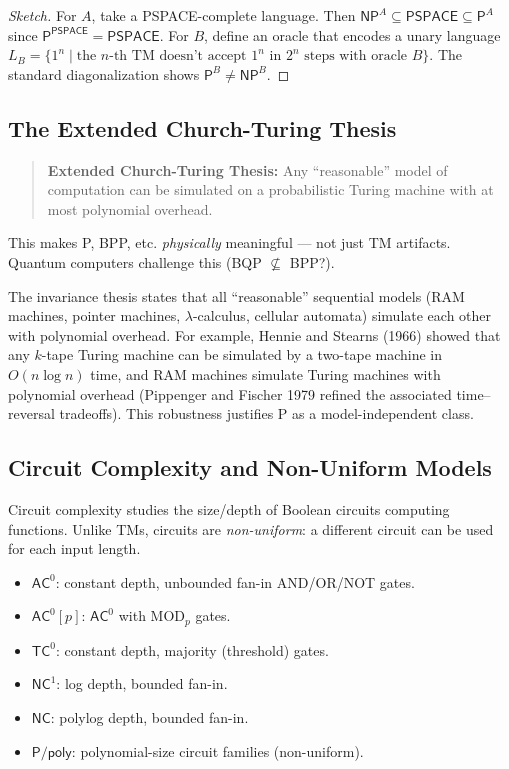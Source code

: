 \begin{proof}[Sketch]
For $A$, take a PSPACE-complete language. Then $\mathsf{NP}^A \subseteq \mathsf{PSPACE} \subseteq \mathsf{P}^A$ since $\mathsf{P}^{\mathsf{PSPACE}} = \mathsf{PSPACE}$. For $B$, define an oracle that encodes a unary language $L_B = \{ 1^n \mid \text{the } n\text{-th TM doesn't accept } 1^n \text{ in } 2^n \text{ steps with oracle } B \}$. The standard diagonalization shows $\mathsf{P}^B \neq \mathsf{NP}^B$.
\end{proof}

\subsection{The Extended Church-Turing Thesis}
\label{sec:complexity:ect}

\begin{quote}
\textbf{Extended Church-Turing Thesis:} Any ``reasonable'' model of computation can be simulated on a probabilistic Turing machine with at most polynomial overhead.
\end{quote}

This makes P, BPP, etc. \emph{physically} meaningful — not just TM artifacts. Quantum computers challenge this (BQP $\not\subseteq$ BPP?).

The invariance thesis states that all ``reasonable'' sequential models (RAM machines, pointer machines, $\lambda$-calculus, cellular automata) simulate each other with polynomial overhead. For example, Hennie and Stearns (1966) showed that any $k$-tape Turing machine can be simulated by a two-tape machine in $O(n \log n)$ time, and RAM machines simulate Turing machines with polynomial overhead (Pippenger and Fischer 1979 refined the associated time--reversal tradeoffs). This robustness justifies P as a model-independent class.

\subsection{Circuit Complexity and Non-Uniform Models}
\label{sec:complexity:circuits}

Circuit complexity studies the size/depth of Boolean circuits computing functions. Unlike TMs, circuits are \emph{non-uniform}: a different circuit can be used for each input length.

\begin{definition}
\begin{itemize}
\item $\mathsf{AC}^0$: constant depth, unbounded fan-in AND/OR/NOT gates.
\item $\mathsf{AC}^0[p]$: $\mathsf{AC}^0$ with MOD$_p$ gates.
\item $\mathsf{TC}^0$: constant depth, majority (threshold) gates.
\item $\mathsf{NC}^1$: log depth, bounded fan-in.
\item $\mathsf{NC}$: polylog depth, bounded fan-in.
\item $\mathsf{P}/\mathsf{poly}$: polynomial-size circuit families (non-uniform).
\end{itemize}
\end{definition}

